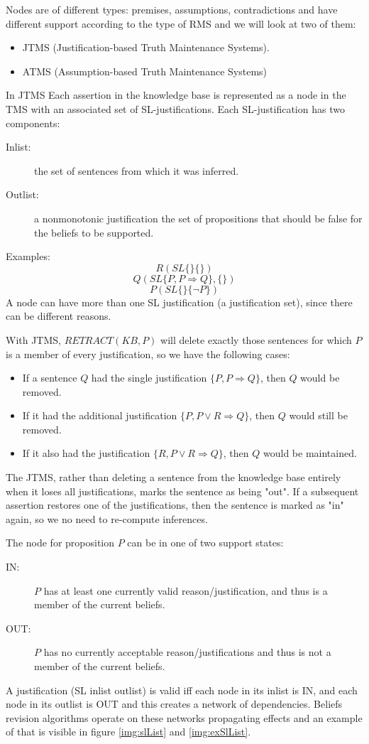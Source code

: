 Nodes are of different types: premises, assumptions, contradictions and have different
support according to the type of RMS and we will look at two of them:
\begin{itemize}
  \item JTMS (Justification-based Truth Maintenance Systems).
  \item ATMS (Assumption-based Truth Maintenance Systems)
\end{itemize}
In JTMS Each assertion in the knowledge base is represented as a node in the TMS with an
associated set of SL-justifications.\newline
Each SL-justification has two components:
\begin{description}
    \item [Inlist: ] the set of sentences from which it was inferred.
    \item [Outlist: ] a nonmonotonic justification the set of propositions that
	             should be false for the beliefs to be supported.
\end{description}
Examples:
\[ R (SL \{ \} \{ \}) \]
\[ Q (SL \{P, P \Rightarrow Q \}, \{\}) \]
\[ P (SL \{ \} \{\neg  P \}) \]
A node can have more than one SL justification (a justification set), since there
can be different reasons.

With JTMS, $RETRACT(KB, P)$ will delete exactly those sentences for which $P$ is a
member of every justification, so we have the following cases:
\begin{itemize}
 \item If a sentence $Q$ had the single justification $\{P, P \Rightarrow Q \}$, 
       then $Q$ would be removed.
 \item If it had the additional justification $\{P, P \lor R \Rightarrow Q \}$,
       then $Q$ would still be removed.
 \item If it also had the justification $\{R, P \lor R \Rightarrow Q \}$,
       then $Q$ would be maintained.
\end{itemize}
The JTMS, rather than deleting a sentence from the knowledge base
entirely when it loses all justifications, marks the sentence as being "out".\newline
If a subsequent assertion restores one of the justifications, then the
sentence is marked as "in" again, so we no need to re-compute inferences.

The node for proposition $P$ can be in one of two support states:
\begin{description}
 \item [IN: ] $P$ has at least one currently valid reason/justification,
	      and thus is a member of the current beliefs.
 \item [OUT: ] $P$ has no currently acceptable reason/justifications and
	       thus is not a member of the current beliefs.
\end{description}
A justification (SL inlist outlist) is valid iff each node in its inlist is IN,
and each node in its outlist is OUT and this creates a network of dependencies.\newline
Beliefs revision algorithms operate on these networks propagating effects and 
an example of that is visible in figure \ref{img:slList} and \ref{img:exSlList}.

